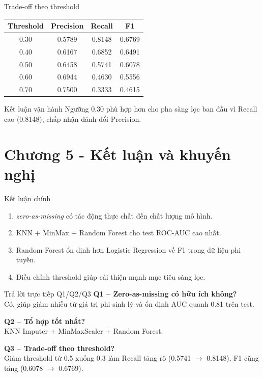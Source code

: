 \documentclass[10pt]{beamer}
\begin{document}
\begin{frame}{Trade-off theo threshold}
  \scriptsize
  \begin{table}
    \centering
    \begin{tabular}{cccc}
      \toprule
      Threshold & Precision & Recall & F1 \\
      \midrule
      0.30 & 0.5789 & 0.8148 & 0.6769 \\
      0.40 & 0.6167 & 0.6852 & 0.6491 \\
      0.50 & 0.6458 & 0.5741 & 0.6078 \\
      0.60 & 0.6944 & 0.4630 & 0.5556 \\
      0.70 & 0.7500 & 0.3333 & 0.4615 \\
      \bottomrule
    \end{tabular}
  \end{table}
  \begin{alertblock}{Kết luận vận hành}
    Ngưỡng 0.30 phù hợp hơn cho pha sàng lọc ban đầu vì Recall cao (0.8148), chấp nhận đánh đổi Precision.
  \end{alertblock}
\end{frame}

\section{Chương 5 - Kết luận và khuyến nghị}

\begin{frame}{Kết luận chính}
  \begin{enumerate}
    \item \textit{zero-as-missing} có tác động thực chất đến chất lượng mô hình.
    \item KNN + MinMax + Random Forest cho test ROC-AUC cao nhất.
    \item Random Forest ổn định hơn Logistic Regression về F1 trong dữ liệu phi tuyến.
    \item Điều chỉnh threshold giúp cải thiện mạnh mục tiêu sàng lọc.
  \end{enumerate}
\end{frame}

\begin{frame}{Trả lời trực tiếp Q1/Q2/Q3}
  \textbf{Q1 -- Zero-as-missing có hữu ích không?}\\
  Có, giúp giảm nhiễu từ giá trị phi sinh lý và ổn định AUC quanh 0.81 trên test.
  \vspace{0.4em}

  \textbf{Q2 -- Tổ hợp tốt nhất?}\\
  KNN Imputer + MinMaxScaler + Random Forest.
  \vspace{0.4em}

  \textbf{Q3 -- Trade-off theo threshold?}\\
  Giảm threshold từ 0.5 xuống 0.3 làm Recall tăng rõ (0.5741 $\rightarrow$ 0.8148),
  F1 cũng tăng (0.6078 $\rightarrow$ 0.6769).
\end{frame}
\end{document}
